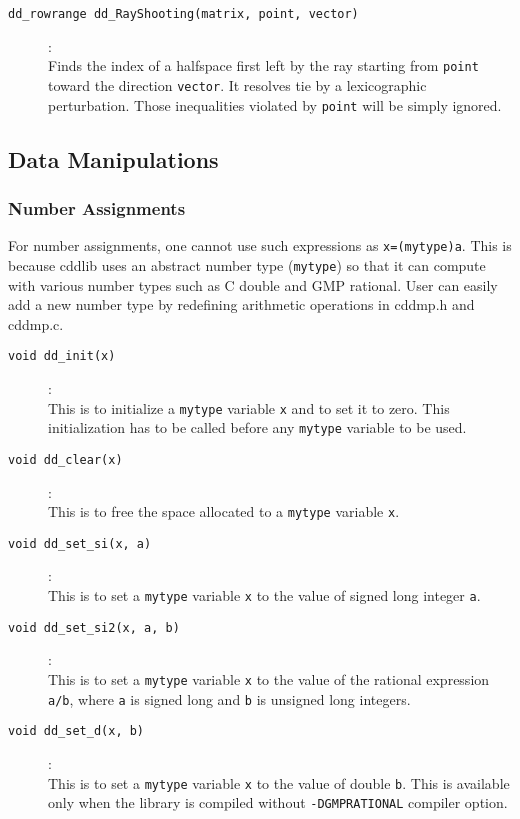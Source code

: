 \documentclass[11pt]{article}
\newcommand {\0} {{\bf 0}}
\begin{document}
\begin{description}
\item[{\tt dd\_rowrange dd\_RayShooting(matrix, point, vector)}]:\\
Finds the index of a halfspace first left by the ray starting from
{\tt point} toward the direction {\tt vector}.  It resolves
tie by a lexicographic perturbation.  Those inequalities violated
by {\tt point} will be simply ignored.

\end{description}


\subsection{Data Manipulations}  \label{DataLibrary}

\subsubsection{Number Assignments}
For number assignments, one cannot use such expressions as {\tt x=(mytype)a}.
This is because cddlib uses an abstract number type ({\tt mytype}) 
so that it can compute with various 
number types such as C double and GMP rational.
User can easily add a new number type by redefining
arithmetic operations in cddmp.h and cddmp.c.

\begin{description}


\item[{\tt void dd\_init(x)}]:\\
This is to initialize a {\tt mytype} variable {\tt x} and to set it
to zero.    This initialization has to be called before
any {\tt mytype} variable to be used.

\item[{\tt void dd\_clear(x)}]:\\
This is to free the space allocated to a {\tt mytype} variable {\tt x}.

\item[{\tt void dd\_set\_si(x, a)}]:\\
This is to set a {\tt mytype} variable {\tt x} to the
value of signed long integer {\tt a}.  

\item[{\tt void dd\_set\_si2(x, a, b)}]:\\
This is to set a {\tt mytype} variable {\tt x} to the
value of  the rational expression {\tt a/b}, where
{\tt a} is signed long and  {\tt b} is unsigned long
integers.  

\item[{\tt void dd\_set\_d(x, b)}]:\\
This is to set a {\tt mytype} variable {\tt x} to the
value of double {\tt b}.  This is available only
when the library is compiled without {\tt -DGMPRATIONAL}
compiler option.

\end{description}
\end{document}
